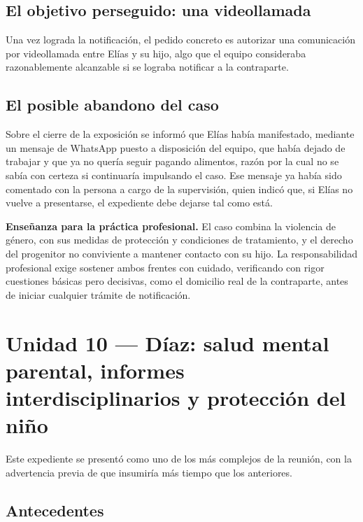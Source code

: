 \documentclass[12pt,oneside]{book}
\begin{document}
\subsection{El objetivo perseguido: una videollamada}

Una vez lograda la notificación, el pedido concreto es autorizar una comunicación por videollamada entre Elías y su hijo, algo que el equipo consideraba razonablemente alcanzable si se lograba notificar a la contraparte.

\subsection{El posible abandono del caso}

Sobre el cierre de la exposición se informó que Elías había manifestado, mediante un mensaje de WhatsApp puesto a disposición del equipo, que había dejado de trabajar y que ya no quería seguir pagando alimentos, razón por la cual no se sabía con certeza si continuaría impulsando el caso. Ese mensaje ya había sido comentado con la persona a cargo de la supervisión, quien indicó que, si Elías no vuelve a presentarse, el expediente debe dejarse tal como está.

\begin{note}
\textbf{Enseñanza para la práctica profesional.} El caso combina la violencia de género, con sus medidas de protección y condiciones de tratamiento, y el derecho del progenitor no conviviente a mantener contacto con su hijo. La responsabilidad profesional exige sostener ambos frentes con cuidado, verificando con rigor cuestiones básicas pero decisivas, como el domicilio real de la contraparte, antes de iniciar cualquier trámite de notificación.
\end{note}

\section{Unidad 10 --- Díaz: salud mental parental, informes interdisciplinarios y protección del niño}

Este expediente se presentó como uno de los más complejos de la reunión, con la advertencia previa de que insumiría más tiempo que los anteriores.

\subsection{Antecedentes}
\end{document}
